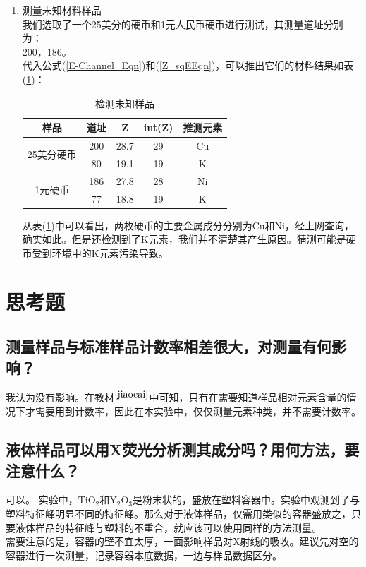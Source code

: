 \documentclass[a4paper]{article}
\begin{document}
\begin{enumerate}
\item 测量未知材料样品\\
我们选取了一个25美分的硬币和1元人民币硬币进行测试，其测量道址分别为：\\
200，186。\\
代入公式(\ref{E-Channel_Eqn})和(\ref{Z_sqEEqn})，可以推出它们的材料结果如表(\ref{unknown})：\\
\begin{table}[!h]
\centering
\caption{检测未知样品}
\label{unknown}
\begin{tabular}{|c|c|c|c|c|}
\hline
样品                      & 道址  & Z    & int(Z) & 推测元素 \\ \hline
\multirow{2}{*}{25美分硬币} & 200 & 28.7 & 29     & Cu \\ \cline{2-5} 
                        & 80  & 19.1 & 19     & K  \\ \hline
\multirow{2}{*}{1元硬币}   & 186 & 27.8 & 28     & Ni \\ \cline{2-5} 
                        & 77  & 18.8 & 19     & K  \\ \hline
\end{tabular}
\end{table}

从表(\ref{unknown})中可以看出，两枚硬币的主要金属成分分别为Cu和Ni，经上网查询，确实如此。但是还检测到了K元素，我们并不清楚其产生原因。猜测可能是硬币受到环境中的K元素污染导致。
\end{enumerate}

\section{思考题}
\subsection{测量样品与标准样品计数率相差很大，对测量有何影响？}
我认为没有影响。在教材$^{\cite{jiaocai}}$中可知，只有在需要知道样品相对元素含量的情况下才需要用到计数率，因此在本实验中，仅仅测量元素种类，并不需要计数率。

\subsection{液体样品可以用X荧光分析测其成分吗？用何方法，要注意什么？}
可以。
实验中，TiO$_2$和Y$_2$O$_3$是粉末状的，盛放在塑料容器中。实验中观测到了与塑料特征峰明显不同的特征峰。那么对于液体样品，仅需用类似的容器盛放之，只要液体样品的特征峰与塑料的不重合，就应该可以使用同样的方法测量。\\
需要注意的是，容器的壁不宜太厚，一面影响样品对X射线的吸收。建议先对空的容器进行一次测量，记录容器本底数据，一边与样品数据区分。


\end{document}
